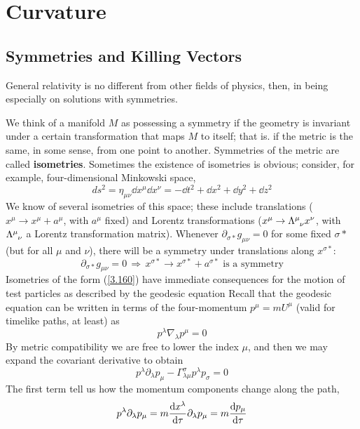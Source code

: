 \section{Curvature}
\subsection{Symmetries and Killing Vectors}
General relativity is no different from other fields of physics, then, in being especially on solutions with symmetries.

We think of a manifold $M$ as possessing a symmetry if the geometry is invariant under a certain transformation that maps $M$ to itself; that is. if the metric is the same, in some sense, from one point to another. Symmetries of the metric are called \textbf{isometries}. Sometimes the existence of isometries is obvious; consider, for example, four-dimensional Minkowski space,
\begin{equation*}
    ds^2=\eta_{\mu\nu}\dd x^\mu\dd x^\nu=-\dd t^2+\dd x^2+\dd y^2+\dd z^2
\end{equation*}
We know of several isometries of this space; these include translations ($x^\mu\to x^\mu +a^\mu$, with $a^\mu$ fixed) and Lorentz transformations ($x^\mu\to \tensor{\Lambda}{^\mu_\nu}x^\nu$, with $\tensor{\Lambda}{^\mu_\nu}$ a Lorentz transformation matrix). Whenever $\partial_{\sigma*}g_{\mu\nu}=0$ for some fixed $\sigma*$ (but for all $\mu$ and $\nu$), there will be a symmetry under translations along $x^{\sigma*}$:
\begin{equation}\label{3.160}
    \partial_{\sigma*}g_{\mu\nu}=0\, \Rightarrow\, x^{\sigma*}\to x^{\sigma*}+a^{\sigma*}\text{ is a symmetry}
\end{equation}
Isometries of the form (\ref{3.160}) have immediate consequences for the motion of test particles as described by the geodesic equation Recall that the geodesic equation can be written in terms of the four-momentum $p^\mu=mU^\mu$ (valid for timelike paths, at least) as
\begin{equation*}
    p^\lambda\nabla_\lambda p^\mu=0
\end{equation*}
By metric compatibility we are free to lower the index $\mu$, and then we may expand the covariant derivative to obtain
\begin{equation*}
    p^\lambda\partial_\lambda p_\mu-\Gamma^\sigma_{\lambda\mu}p^\lambda p_\sigma=0
\end{equation*}
The first term tell us how the momentum components change along the path,
\begin{equation*}
    p^\lambda\partial_\lambda p_\mu=m\dv{x^\lambda}{\tau}\partial_\lambda p_\mu=m\dv{p_\mu}{\tau}
\end{equation*}
